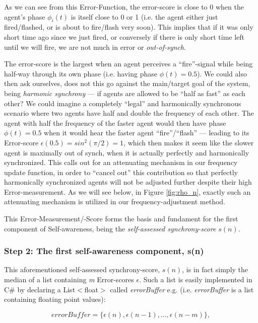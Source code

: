 	As we can see from this Error-Function, the error-score is close to 0 when the agent's phase $\phi_i(t)$ is itself close to 0 or 1 (i.e. the agent either just fired/flashed, or is about to fire/flash very soon). This implies that if it was only short time ago since we just fired, or conversely if there is only short time left until we will fire, we are not much in error or \textit{out-of-synch}. 
	
	The error-score is the largest when an agent perceives a ``fire''-signal while being half-way through its own phase (i.e. having phase $\phi(t)=0.5$). We could also then ask ourselves, does not this go against the main/target goal of the system, being \textit{harmonic synchrony} — if agents are allowed to be ``half as fast'' as each other? We could imagine a completely ``legal'' and harmonically synchronous scenario where two agents have half and double the frequency of each other. The agent with half the frequency of the faster agent would then have phase $\phi(t)=0.5$ when it would hear the faster agent ``fire''/``flash'' — leading to its Error-score $\epsilon(0.5) = sin^2(\pi/2) = 1$, which then makes it seem like the slower agent is maximally out of synch, when it is actually perfectly and harmonically synchronized. This calls out for an attenuating mechanism in our frequency update function, in order to ``cancel out'' this contribution so that perfectly harmonically synchronized agents will not be adjusted further despite their high Error-measurement. As we will see below, in Figure \ref{fig:rho_n}, exactly such an attenuating mechanism is utilized in our frequency-adjustment method.
	
	This Error-Measurement/-Score forms the basis and fundament for the first component of Self-awareness, being the \textit{self-assessed synchrony-score} $s(n)$.
	
	\subsubsection{Step 2: The first self-awareness component, s(n)}
	This aforementioned self-assessed synchrony-score, $s(n)$, is in fact simply the median of a list containing \textit{m} Error-scores $\epsilon$. Such a list is easily implemented in C\# by declaring a List$<$float$>$ called \textit{errorBuffer} e.g. (i.e. \textit{errorBuffer} is a list containing floating point values):
	
	\begin{equation}
	\label{error_buffer}
		errorBuffer = \{\epsilon(n), \epsilon(n-1), ... , \epsilon(n-m)\},
	\end{equation} \nl
	
